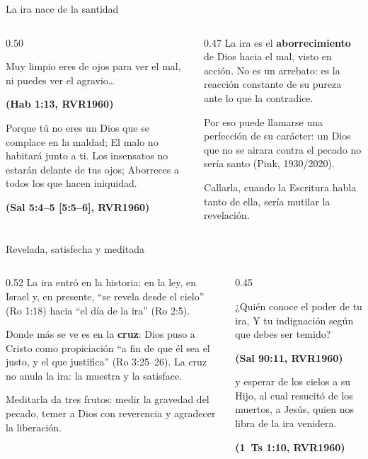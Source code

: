 \documentclass[hyperref={bookmarks=false},aspectratio=169]{beamer}
\newcommand{\fuente}[1]{\par\hfill{\upshape\bfseries\footnotesize\textcolor{azul}{#1}}}
\newcommand{\destacar}[1]{\textbf{\textcolor{azul}{#1}}}
\begin{document}
\begin{frame}{La ira nace de la santidad}
\begin{columns}[t,onlytextwidth]
\begin{column}{0.50\textwidth}
\begin{cita}Muy limpio eres de ojos para ver el mal, ni puedes ver el agravio\ldots{}\fuente{(Hab 1:13, RVR1960)}\end{cita}
\begin{cita}Porque tú no eres un Dios que se complace en la maldad; El malo no habitará junto a ti. Los insensatos no estarán delante de tus ojos; Aborreces a todos los que hacen iniquidad.\fuente{(Sal 5:4--5 [5:5--6], RVR1960)}\end{cita}
\end{column}
\begin{column}{0.47\textwidth}\small
La ira es el \destacar{aborrecimiento} de Dios hacia el mal, visto en acción. No es un arrebato: es la reacción constante de su pureza ante lo que la contradice.\par\medskip
Por eso puede llamarse una perfección de su carácter: un Dios que no se airara contra el pecado no sería santo (Pink, 1930/2020).\par\medskip
Callarla, cuando la Escritura habla tanto de ella, sería mutilar la revelación.
\end{column}
\end{columns}
\end{frame}

\begin{frame}{Revelada, satisfecha y meditada}
\begin{columns}[t,onlytextwidth]
\begin{column}{0.52\textwidth}\small
La ira entró en la historia: en la ley, en Israel y, en presente, ``se revela desde el cielo'' (Ro 1:18) hacia ``el día de la ira'' (Ro 2:5).\par\medskip
Donde más se ve es en la \destacar{cruz}: Dios puso a Cristo como propiciación ``a fin de que él sea el justo, y el que justifica'' (Ro 3:25--26). La cruz no anula la ira: la muestra y la satisface.\par\medskip
Meditarla da tres frutos: medir la gravedad del pecado, temer a Dios con reverencia y agradecer la liberación.
\end{column}
\begin{column}{0.45\textwidth}
\begin{cita}¿Quién conoce el poder de tu ira, Y tu indignación según que debes ser temido?\fuente{(Sal 90:11, RVR1960)}\end{cita}
\begin{cita}y esperar de los cielos a su Hijo, al cual resucitó de los muertos, a Jesús, quien nos libra de la ira venidera.\fuente{(1~Ts 1:10, RVR1960)}\end{cita}
\end{column}
\end{columns}
\end{frame}
\end{document}
